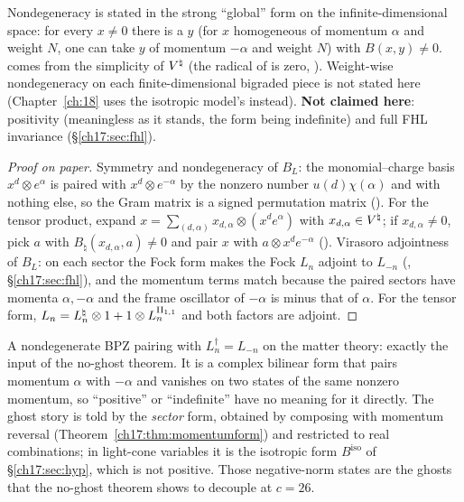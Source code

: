 \begin{dictionary}
Nondegeneracy is stated in the strong ``global'' form on the infinite-dimensional space: for every $x\ne0$ there is a
$y$ (for $x$ homogeneous of momentum $\alpha$ and weight $N$, one can take $y$ of momentum $-\alpha$ and weight $N$) with $B(x,y)\ne0$.   comes
from the simplicity of ${V^{\natural}}$ (the radical of  is zero, ).  Weight-wise
nondegeneracy on each finite-dimensional bigraded piece is not stated here (Chapter~\ref{ch:18} uses the isotropic
model's  instead).  \textbf{Not claimed here}: positivity (meaningless as it stands, the form being
indefinite) and full FHL invariance (\S\ref{ch17:sec:fhl}).
\end{dictionary}

\begin{proof}[Proof on paper]
Symmetry and nondegeneracy of $B_L$: the monomial--charge basis $x^d\otimes e^\alpha$ is paired with $x^d\otimes e^{-\alpha}$ by the
nonzero number $u(d)\chi(\alpha)$ and with nothing else, so the Gram matrix is a signed permutation matrix
().  For the tensor product, expand $x=\sum_{(d,\alpha)}x_{d,\alpha}\otimes(x^d e^\alpha)$ with
$x_{d,\alpha}\in{V^{\natural}}$; if $x_{d,\alpha}\ne0$, pick $a$ with $B_\natural(x_{d,\alpha},a)\ne0$ and pair $x$ with $a\otimes x^de^{-\alpha}$
().  Virasoro adjointness of $B_L$: on each sector the Fock form makes the Fock
$L_n$ adjoint to $L_{-n}$ (, \S\ref{ch17:sec:fhl}), and the momentum terms match because the
paired sectors have momenta $\alpha,-\alpha$ and the frame oscillator of $-\alpha$ is minus that of $\alpha$.  For the tensor form,
$L_n=L^\natural_n\otimes1+1\otimes L^{{\mathrm{II}_{1,1}}}_n$ and both factors are adjoint.
\end{proof}

\begin{physics}
A nondegenerate BPZ pairing with $L_n^\dagger=L_{-n}$ on the matter theory: exactly the input of the no-ghost theorem.
It is a complex bilinear form that pairs momentum $\alpha$ with $-\alpha$ and vanishes on two states of the same nonzero
momentum, so ``positive'' or ``indefinite'' have no meaning for it directly.  The ghost story is told by the
\emph{sector} form, obtained by composing with momentum reversal (Theorem~\ref{ch17:thm:momentumform}) and restricted to
real combinations; in light-cone variables it is the isotropic form $B^{\mathrm{iso}}$ of \S\ref{ch17:sec:hyp}, which is
not positive.  Those negative-norm states are the ghosts that the no-ghost theorem shows to decouple at $c=26$.
\end{physics}

